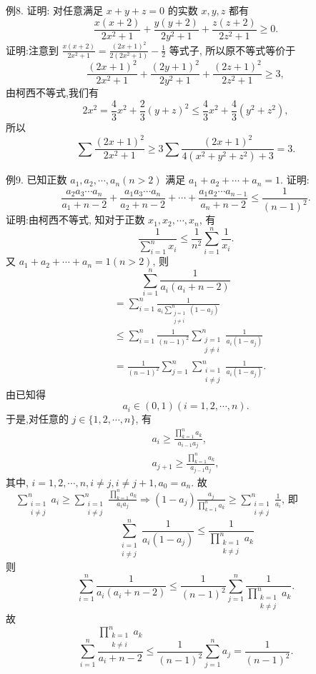 例8. 证明: 对任意满足 $x+y+z=0$ 的实数 $x, y, z$ 都有
$$
\frac{x(x+2)}{2 x^2+1}+\frac{y(y+2)}{2 y^2+1}+\frac{z(z+2)}{2 z^2+1} \geqslant 0 .
$$
证明:注意到 $\frac{x(x+2)}{2 x^2+1}=\frac{(2 x+1)^2}{2\left(2 x^2+1\right)}-\frac{1}{2}$ 等式子, 所以原不等式等价于
$$
\frac{(2 x+1)^2}{2 x^2+1}+\frac{(2 y+1)^2}{2 y^2+1}+\frac{(2 z+1)^2}{2 z^2+1} \geqslant 3,
$$
由柯西不等式,我们有
$$
2 x^2=\frac{4}{3} x^2+\frac{2}{3}(y+z)^2 \leqslant \frac{4}{3} x^2+\frac{4}{3}\left(y^2+z^2\right),
$$
所以
$$
\sum \frac{(2 x+1)^2}{2 x^2+1} \geqslant 3 \sum \frac{(2 x+1)^2}{4\left(x^2+y^2+z^2\right)+3}=3 .
$$



例9. 已知正数 $a_1, a_2, \cdots, a_n(n>2)$ 满足 $a_1+a_2+\cdots+a_n=1$. 证明:
$$
\frac{a_2 a_3 \cdots a_n}{a_1+n-2}+\frac{a_1 a_3 \cdots a_n}{a_2+n-2}+\cdots+\frac{a_1 a_2 \cdots a_{n-1}}{a_n+n-2} \leqslant \frac{1}{(n-1)^2} .
$$
证明:由柯西不等式, 知对于正数 $x_1, x_2, \cdots, x_n$, 有
$$
\frac{1}{\sum_{i=1}^n x_i} \leqslant \frac{1}{n^2} \sum_{i=1}^n \frac{1}{x_i} .
$$
又 $a_1+a_2+\cdots+a_n=1(n>2)$, 则
$$
\sum_{i=1}^n \frac{1}{a_i\left(a_i+n-2\right)}
$$
$$
\begin{aligned}
& =\sum_{i=1}^n \frac{1}{a_i \sum_{\substack{j=1 \\
j \neq i}}^n\left(1-a_j\right)} \\
& \leqslant \sum_{i=1}^n \frac{1}{(n-1)^2} \sum_{\substack{j=1 \\
j \neq i}}^n \frac{1}{a_i\left(1-a_j\right)} \\
& =\frac{1}{(n-1)^2} \sum_{j=1}^n \sum_{\substack{i=1 \\
i \neq j}}^n \frac{1}{a_i\left(1-a_j\right)} .
\end{aligned}
$$
由已知得
$$
a_i \in(0,1)(i=1,2, \cdots, n) .
$$
于是,对任意的 $j \in\{1,2, \cdots, n\}$, 有
$$
\begin{array}{r}
a_i \geqslant \frac{\prod_{k=1}^n a_k}{a_{i-1} a_j}, \\
a_{j+1} \geqslant \frac{\prod_{k=1}^n a_k}{a_{j-1} a_j},
\end{array}
$$
其中, $i=1,2, \cdots, n, i \neq j, i \neq j+1, a_0=a_n$.
故 $\quad \sum_{\substack{i=1 \\ i \neq j}}^n a_i \geqslant \sum_{\substack{i=1 \\ i \neq j}}^n \frac{\prod_{k=1}^n a_k}{a_i a_j} \Rightarrow\left(1-a_j\right) \frac{a_j}{\prod_{k=1}^n a_k} \geqslant \sum_{\substack{i=1 \\ i \neq j}}^n \frac{1}{a_i}$, 即
$$
\sum_{\substack{i=1 \\ i \neq j}}^n \frac{1}{a_i\left(1-a_j\right)} \leqslant \frac{1}{\prod_{\substack{k=1 \\ k \neq j}}^n a_k}
$$
则
$$
\sum_{i=1}^n \frac{1}{a_i\left(a_i+n-2\right)} \leqslant \frac{1}{(n-1)^2} \sum_{j=1}^n \frac{1}{\prod_{\substack{k=1 \\ k \neq j}}^n a_k} .
$$
故
$$
\sum_{i=1}^n \frac{\prod_{\substack{k=1 \\ k \neq i}}^n a_k}{a_i+n-2} \leqslant \frac{1}{(n-1)^2} \sum_{j=1}^n a_j=\frac{1}{(n-1)^2} .
$$



